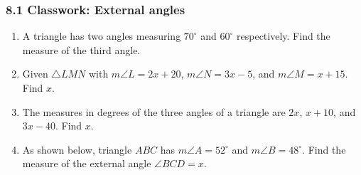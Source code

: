 

\fancyhead[LE]{\thepage}



\subsubsection*{8.1 Classwork: External angles}
\begin{enumerate}
\item A triangle has two angles measuring $70^\circ$ and $60^\circ$ respectively. Find the measure of the third angle. \vspace{2cm}

\item Given  $\triangle LMN$ with $m\angle L=2x+20$, $m\angle N=3x-5$, and $m\angle M=x+15$. Find $x$.
  \begin{flushright}
  \end{flushright} \vspace{2cm}

\item The measures in degrees of the three angles of a triangle are $2x$, $x+10$, and $3x-40$. Find $x$. \vspace{4cm}

\item As shown below, triangle $ABC$ has $m\angle A = 52^\circ$ and $m\angle B = 48^\circ$. Find the measure of the external angle $\angle BCD = x$.
  \begin{flushleft}
  \end{flushleft}
  

\end{enumerate}
